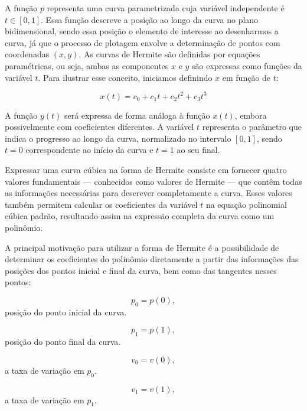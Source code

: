 A função $p$ representa uma curva parametrizada cuja variável independente é \( t \in [0,1] \). Essa função descreve a posição ao longo da curva no plano bidimensional, sendo essa posição o elemento de interesse ao desenharmos a curva, já que o processo de plotagem envolve a determinação de pontos com coordenadas $(x, y)$. As curvas de Hermite são definidas por equações paramétricas, ou seja, ambas as componentes $x$ e  $y$ são expressas como funções da variável $t$. Para ilustrar esse conceito, iniciamos definindo $x$ em função de $t$:

\begin{equation}
    x(t) = c_0 + c_1t + c_2t^2 + c_3t^3
\end{equation}

A função \( y(t) \) será expressa de forma análoga à função \( x(t) \), embora possivelmente com coeficientes diferentes. A variável \( t \) representa o parâmetro que indica o progresso ao longo da curva, normalizado no intervalo \( [0,1] \), sendo \( t = 0 \) correspondente ao início da curva e \( t = 1 \) ao seu final.

Expressar uma curva cúbica na forma de Hermite consiste em fornecer quatro valores fundamentais — conhecidos como valores de Hermite — que contêm todas as informações necessárias para descrever completamente a curva. Esses valores também permitem calcular os coeficientes da variável \( t \) na equação polinomial cúbica padrão, resultando assim na expressão completa da curva como um polinômio.

A principal motivação para utilizar a forma de Hermite é a possibilidade de determinar os coeficientes do polinômio diretamente a partir das informações das posições dos pontos inicial e final da curva, bem como das tangentes nesses pontos:


\begin{equation}
    p_0 = p(0),
\end{equation}
posição do ponto inicial da curva.

\begin{equation}
    p_1 = p(1),
\end{equation}
posição do ponto final da curva.

\begin{equation}
    v_0 = v(0),
\end{equation}
a taxa de variação em $p_0$.

\begin{equation}
    v_1 = v(1),
\end{equation}
a taxa de variação em $p_1$.

